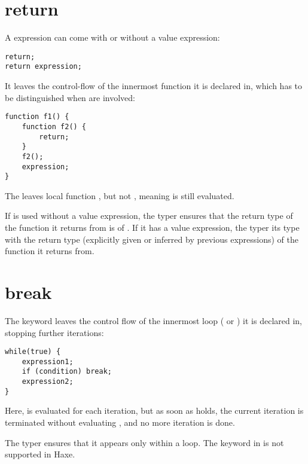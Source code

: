 \section{return}
\label{expression-return}

A  expression can come with or without a value expression:

\begin{lstlisting}
return;
return expression;
\end{lstlisting}

It leaves the control-flow of the innermost function it is declared in, which has to be distinguished when  are involved:

\begin{lstlisting}
function f1() {
	function f2() {
		return;
	}
	f2();
	expression;
}
\end{lstlisting}

The  leaves local function , but not , meaning  is still evaluated.

If  is used without a value expression, the typer ensures that the return type of the function it returns from is of . If it has a value expression, the typer  its type with the return type (explicitly given or inferred by previous  expressions) of the function it returns from.


\section{break}
\label{expression-break}

The  keyword leaves the control flow of the innermost loop ( or ) it is declared in, stopping further iterations:

\begin{lstlisting}
while(true) {
	expression1;
	if (condition) break;
	expression2;
}
\end{lstlisting}

Here,  is evaluated for each iteration, but as soon as  holds, the current iteration is terminated without evaluating , and no more iteration is done.

The typer ensures that it appears only within a loop. The  keyword in  is not supported in Haxe.


